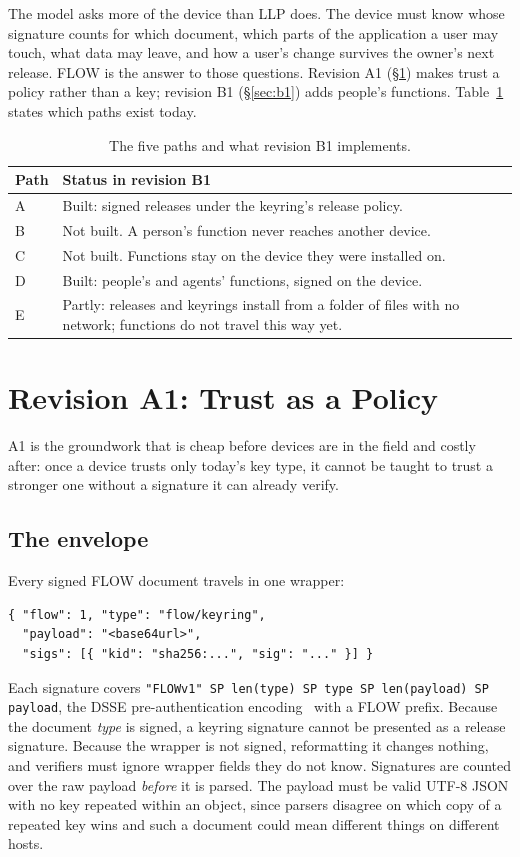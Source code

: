 \documentclass[10pt,twocolumn]{article}
\newcommand{\code}[1]{\texttt{#1}}
\begin{document}
The model asks more of the device than LLP does. The device must know whose signature counts for
which document, which parts of the application a user may touch, what data may leave, and how a
user's change survives the owner's next release. FLOW is the answer to those questions. Revision
A1 (\S\ref{sec:a1}) makes trust a policy rather than a key; revision B1 (\S\ref{sec:b1}) adds people's
functions. Table~\ref{tab:paths} states which paths exist today.

\begin{table}[t]
\centering\footnotesize
\begin{tabularx}{\columnwidth}{@{}lX@{}}
\toprule
Path & Status in revision B1 \\
\midrule
A & Built: signed releases under the keyring's release policy. \\
B & Not built. A person's function never reaches another device. \\
C & Not built. Functions stay on the device they were installed on. \\
D & Built: people's and agents' functions, signed on the device. \\
E & Partly: releases and keyrings install from a folder of files with no network; functions do not
travel this way yet. \\
\bottomrule
\end{tabularx}
\caption{The five paths and what revision B1 implements.}
\label{tab:paths}
\end{table}

\section{Revision A1: Trust as a Policy}
\label{sec:a1}

A1 is the groundwork that is cheap before devices are in the field and costly after: once a device
trusts only today's key type, it cannot be taught to trust a stronger one without a signature it
can already verify.

\subsection{The envelope}

Every signed FLOW document travels in one wrapper:
\begin{lstlisting}
{ "flow": 1, "type": "flow/keyring",
  "payload": "<base64url>",
  "sigs": [{ "kid": "sha256:...", "sig": "..." }] }
\end{lstlisting}
Each signature covers
\code{"FLOWv1" SP len(type) SP type SP len(payload) SP payload}, the DSSE pre-authentication
encoding~\cite{dsse} with a FLOW prefix. Because the document \emph{type} is signed, a keyring
signature cannot be presented as a release signature. Because the wrapper is not signed, reformatting
it changes nothing, and verifiers must ignore wrapper fields they do not know. Signatures are counted
over the raw payload \emph{before} it is parsed. The payload must be valid UTF-8 JSON with no key
repeated within an object, since parsers disagree on which copy of a repeated key wins and such a
document could mean different things on different hosts.
\end{document}
